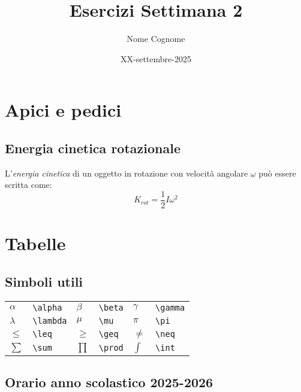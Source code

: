 \documentclass[a4paper,11pt]{article}
\title{Esercizi Settimana 2}
\author{Nome Cognome}
\date{XX-settembre-2025}
\begin{document}
    \maketitle

    \section{Apici e pedici}
    \subsection*{Energia cinetica rotazionale}
    L'\textit{energia cinetica} di un oggetto in rotazione con velocità angolare $\omega$ può essere scritta come:
    \[
    K_{rot} = \frac{1}{2} I\omega^2
    \]

    \section{Tabelle}

    \subsection*{Simboli utili}

    \begin{tabular}{|m{1cm} m{2.5cm}|m{1cm} m{2.5cm}|m{1cm} m{2.5cm}|}\hline
        $\alpha$ & \verb|\alpha|& $\beta$ &\verb|\beta|& $\gamma$ & \verb|\gamma|\\
        $\lambda$ & \verb|\lambda|& $\mu$ &\verb|\mu|& $\pi$ & \verb|\pi|\\
        $\leq$ & \verb|\leq|& $\geq$ &\verb|\geq|& $\neq$ & \verb|\neq|\\
        $\sum$ & \verb|\sum|& $\prod$ &\verb|\prod|& $\int$ & \verb|\int|\\ \hline
    \end{tabular}

    \subsection*{Orario anno scolastico 2025-2026}
    
\end{document}
